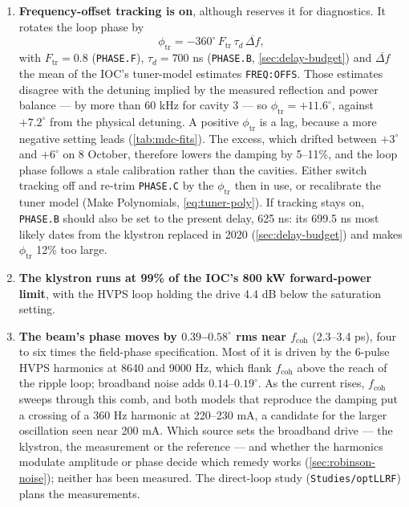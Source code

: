 \begin{enumerate}
\item \textbf{Frequency-offset tracking is on}, although  reserves it for diagnostics. It rotates the loop phase by
\begin{equation}\label{eq:rob-track}
\phi_\text{tr} = -360^\circ\,F_\text{tr}\,\tau_d\,\overline{\Delta f},
\end{equation}
with \(F_\text{tr} = 0.8\) (\texttt{PHASE.F}), \(\tau_d = 700\) ns (\texttt{PHASE.B}, \cref{sec:delay-budget}) and \(\overline{\Delta f}\) the mean of the IOC's tuner-model estimates \texttt{FREQ:\allowbreak{}OFFS}. Those estimates disagree with the detuning implied by the measured reflection and power balance --- by more than 60 kHz for cavity 3 --- so \(\phi_\text{tr} = +11.6^\circ\), against \(+7.2^\circ\) from the physical detuning. A positive \(\phi_\text{tr}\) is a lag, because a more negative setting leads (\cref{tab:mdc-fits}). The excess, which drifted between \(+3^\circ\) and \(+6^\circ\) on 8 October, therefore lowers the damping by 5--11\%, and the loop phase follows a stale calibration rather than the cavities. Either switch tracking off and re-trim \texttt{PHASE.C} by the \(\phi_\text{tr}\) then in use, or recalibrate the tuner model (Make Polynomials, \cref{eq:tuner-poly}). If tracking stays on, \texttt{PHASE.B} should also be set to the present delay, 625 ns: its 699.5 ns most likely dates from the klystron replaced in 2020 (\cref{sec:delay-budget}) and makes \(\phi_\text{tr}\) 12\% too large.
\item \textbf{The klystron runs at 99\% of the IOC's 800 kW forward-power limit}, with the HVPS loop holding the drive 4.4 dB below the saturation setting.
\item \textbf{The beam's phase moves by \(0.39\)--\(0.58^\circ\) rms near \(f_\text{coh}\)} (2.3--3.4 ps), four to six times the field-phase specification. Most of it is driven by the 6-pulse HVPS harmonics at 8640 and 9000 Hz, which flank \(f_\text{coh}\) above the reach of the ripple loop; broadband noise adds \(0.14\)--\(0.19^\circ\). As the current rises, \(f_\text{coh}\) sweeps through this comb, and both models that reproduce the damping put a crossing of a 360 Hz harmonic at 220--230 mA, a candidate for the larger oscillation seen near 200 mA. Which source sets the broadband drive --- the klystron, the measurement or the reference --- and whether the harmonics modulate amplitude or phase decide which remedy works (\cref{sec:robinson-noise}); neither has been measured. The direct-loop study (\texttt{Studies/optLLRF}) plans the measurements.
\end{enumerate}


